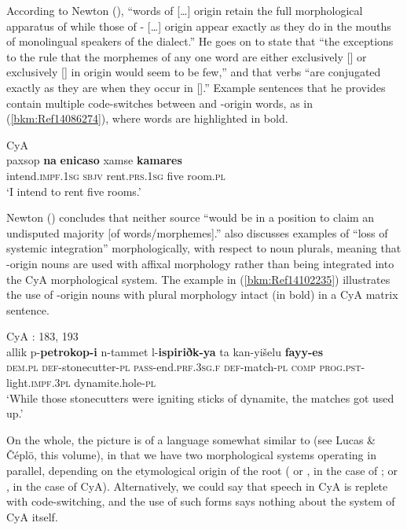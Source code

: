 \documentclass[output=paper]{langsci/langscibook}
\begin{document}
According to Newton (\citeyear[43]{Newton1964}), “words of  […] origin retain the full morphological apparatus of  while those of - […] origin appear exactly as they do in the mouths of {monolingual} speakers of the  dialect.” He goes on to state that “the exceptions to the rule that the morphemes of any one word are either exclusively [] or exclusively [] in origin would seem to be few,” and that  verbs “are conjugated exactly as they are when they occur in [].” Example sentences that he provides contain multiple code-switches between  and -origin words, as in (\ref{bkm:Ref14086274}), where  words are highlighted in bold.

\ea\label{bkm:Ref14086274}
{CyA}{} {\citealt[49]{Newton1964}}\\
\gll paxsop \textbf{na} \textbf{enicaso} xamse \textbf{kamares}\\
     intend.\textsc{impf.1sg} \textsc{sbjv} rent.\textsc{prs.1sg} five room.\textsc{pl}\\
\glt  ‘I intend to rent five rooms.’\z

Newton (\citeyear[50]{Newton1964}) concludes that neither source “would be in a position to claim an undisputed majority [of words/morphemes].” \citet{Gulle2016} also discusses examples of “loss of systemic integration” morphologically, with respect to noun plurals, meaning that -origin nouns are used with  affixal morphology rather than being integrated into the CyA morphological system. The example in (\ref{bkm:Ref14102235}) illustrates the use of -origin nouns with  plural morphology intact (in bold) in a CyA matrix sentence.

\ea\label{bkm:Ref14102235}
{CyA}{} {\citealt{Borg1985}: 183, 193}\\
\gll allik p-\textbf{petrokop-i} n-tammet l-\textbf{ispiriðk-ya} ta kan-yišelu \textbf{fayy-es}\\
     \textsc{dem}.\textsc{pl} \textsc{def}{}-stonecutter-\textsc{pl} \textsc{pass-}end.\textsc{prf.3sg.f} \textsc{def-}match-\textsc{pl} \textsc{comp} \textsc{prog.pst-}light.\textsc{impf.3pl} dynamite.hole-\textsc{pl}\\
\glt ‘While those stonecutters were igniting sticks of dynamite, the matches got used up.’
\z

On the whole, the picture is of a language somewhat similar to  (see Lucas \& Čéplö, this volume), in that we have two morphological systems operating in parallel, depending on the etymological origin of the {root} ( or , in the case of ;  or , in the case of CyA). Alternatively, we could say that speech in CyA is replete with {code-switching}, and the use of such  forms says nothing about the system of CyA itself.
\end{document}
